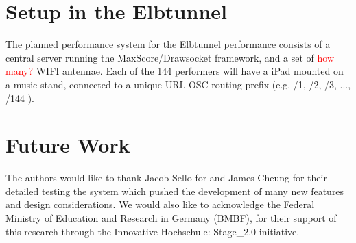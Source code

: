 

\section{Setup in the Elbtunnel}
The planned performance system for the Elbtunnel performance consists of a central server running the MaxScore/Drawsocket framework, and a set of \textcolor{red}{how many?} WIFI antennae.
Each of the 144 performers will have a iPad mounted on a music stand, connected to a unique URL-OSC routing prefix (e.g. {/1}, {/2}, {/3}, ..., {/144} ). 

\section{Future Work}


\begin{acknowledgments}
The authors would like to thank Jacob Sello for and James Cheung for their detailed testing the system which pushed the development of many new features and design considerations. We would also like to acknowledge the Federal Ministry of Education and Research in Germany (BMBF), for their support of this research through the Innovative Hochschule: Stage\_2.0 initiative.
\end{acknowledgments} 

\balance






